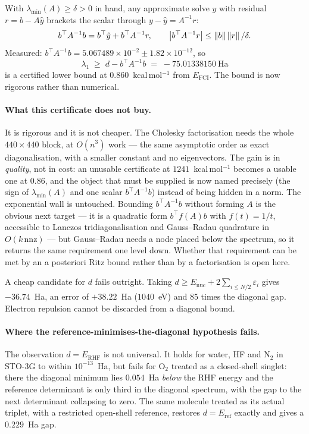 With $\lambda_{\min}(A) \ge \delta > 0$ in hand, any approximate solve $\hat y$ with
residual $r = b - A\hat y$ brackets the scalar through $y - \hat y = A^{-1}r$:
\[
  b^\top A^{-1}b = b^\top\hat y + b^\top A^{-1}r,
  \qquad
  \left\lvert b^\top A^{-1}r\right\rvert \le \left\lVert b\right\rVert\left\lVert r\right\rVert/\delta .
\]
Measured: $b^\top A^{-1}b = 5.067489\times10^{-2} \pm 1.82\times10^{-12}$, so
\[
  \lambda_1 \;\ge\; d - b^\top A^{-1}b \;=\; -75.01338150\ \text{Ha}
\]
is a certified lower bound at $0.860$~kcal\,mol$^{-1}$ from $E_{\mathrm{FCI}}$.
The bound is now rigorous rather than numerical.

\paragraph{What this certificate does not buy.}
It is rigorous and it is not cheaper. The Cholesky factorisation needs the whole
$440\times440$ block, at $O(n^3)$ work --- the same asymptotic order as exact
diagonalisation, with a smaller constant and no eigenvectors. The gain is in
\emph{quality}, not in cost: an unusable certificate at $1241$~kcal\,mol$^{-1}$
becomes a usable one at $0.86$, and the object that must be supplied is now named
precisely (the sign of $\lambda_{\min}(A)$ and one scalar $b^\top A^{-1}b$) instead
of being hidden in a norm. The exponential wall is untouched. Bounding
$b^\top A^{-1}b$ without forming $A$ is the obvious next target --- it is a
quadratic form $b^\top f(A)b$ with $f(t)=1/t$, accessible to Lanczos
tridiagonalisation and Gauss--Radau quadrature in $O(k\,\mathrm{nnz})$ --- but
Gauss--Radau needs a node placed below the spectrum, so it returns the same
requirement one level down. Whether that requirement can be met by an a posteriori
Ritz bound rather than by a factorisation is open here.

A cheap candidate for $d$ fails outright. Taking
$d \ge E_{\mathrm{nuc}} + 2\sum_{i\le N/2}\varepsilon_i$ gives $-36.74$~Ha, an error
of $+38.22$~Ha ($1040$~eV) and $85$ times the diagonal gap. Electron repulsion
cannot be discarded from a diagonal bound.

\paragraph{Where the reference-minimises-the-diagonal hypothesis fails.}
The observation $d = E_{\mathrm{RHF}}$ is not universal. It holds for water, HF and
N$_2$ in STO-3G to within $10^{-13}$~Ha, but fails for O$_2$ treated as a closed-shell
singlet: there the diagonal minimum lies $0.054$~Ha \emph{below} the RHF energy and
the reference determinant is only third in the diagonal spectrum, with the gap to
the next determinant collapsing to zero. The same molecule treated as its actual
triplet, with a restricted open-shell reference, restores $d = E_{\mathrm{ref}}$
exactly and gives a $0.229$~Ha gap.

